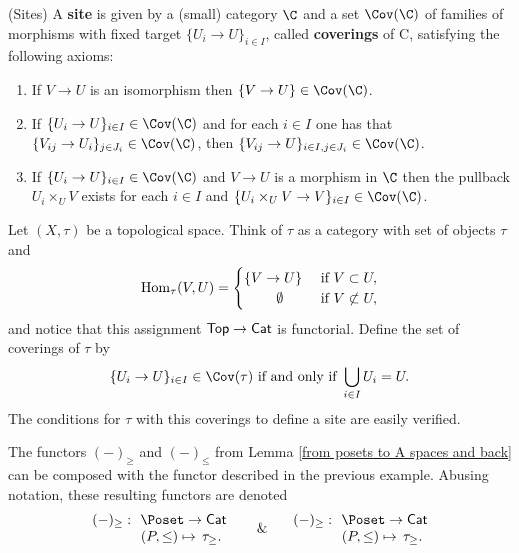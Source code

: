 \documentclass[thesis.tex]{subfiles}
\begin{document}
\begin{definition}(Sites)
A \textbf{site} is given by a (small) category $\C$ and a set $\Cov(\C)$ of families of
morphisms with fixed target $\{U_i\to U\}_{i\in I}$, called \textbf{coverings} of C, satisfying the
following axioms:
\begin{enumerate}[S1:]
\item If $V\to U$ is an isomorphism then $\{V\to U\}\in\Cov(\C)$.
\item If $\{U_i\to U\}_{i\in I}\in\Cov(\C)$ and for each $i\in I$ one has that $\{V_{ij}\to U_i\}_{j\in J_i}\in\Cov(\C)$,
    then $\{V_{ij}\to U\}_{i\in I, j\in J_i}\in\Cov(\C)$.
\item If $\{U_i\to U\}_{i\in I}\in\Cov(\C)$ and $V\to U$ is a morphism in $\C$ then the pullback $U_i\times_U V$ exists for each $i\in I$ and $\{U_i\times_U V\to V\}_{i\in I}\in\Cov(\C)$.
\end{enumerate}
\end{definition}

\begin{example}\label{open sets as a site}
Let $(X,\tau)$ be a topological space.
Think of $\tau$ as a category with set of objects $\tau$ and $$\mathrm{Hom}_\tau(V,U)=\begin{cases}\{V\to U\}& \text{ if } V\subset U,\\ \hspace*{.81cm} \emptyset & \text{ if } V\not\subset U,\end{cases}$$
and notice that this assignment $\mathsf{Top}\to\mathsf{Cat}$ is functorial.
Define the set of coverings of $\tau$ by
$$\{U_i\to U\}_{i\in I}\in\Cov(\tau) \text{ if and only if } \bigcup_{i\in I}U_i=U.\vspace*{-3pt}$$
The conditions for $\tau$ with this coverings to define a site are easily verified.
\end{example}

\begin{remark}\label{rmk: Poset -> Top -> site}
The functors $(-)_\geq$ and $(-)_\leq$ from Lemma \ref{from posets to A spaces and back} can be composed with the functor described in the previous example.
Abusing notation, these resulting functors are denoted
$$\begin{array}{cc}
(-)_\geq:\!\! & \Poset\to\Cat \\
 & \!\!(P,\leq)\mapsto\,\tau_\geq.
\end{array} \text{\ \ \ \ \  \& \ \ \ } \begin{array}{cc}
(-)_\geq:\!\! & \Poset\to\Cat \\
 & \!\!(P,\leq)\mapsto\,\tau_\geq.
\end{array}$$
\end{remark}
\end{document}
